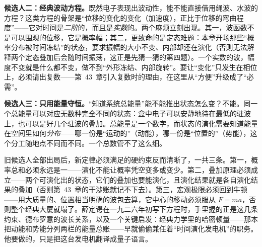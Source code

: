\textbf{候选人二：经典波动方程。}既然电子表现出波动性，能不能直接借用绳波、水波的方程？这类方程的骨架是“位移的变化的变化（加速度），正比于位移的弯曲程度”——它对时间是\emph{二阶}的，而且是\emph{实数}的。两个麻烦立刻出现。其一，波函数不是可以围观的位移，它是概率幅；其二，更致命的是定态难题：本章开场那些“概率分布被时间冻结”的状态，要求振幅的大小不变、内部却还在演化（否则无法解释两个定态叠加后会随时间振荡，这正是先猜一猜的第四题）。一个实数的波，幅度不变就是什么都不变，做不到“外形冻结、内部旋转”。要让“变化”只发生在相位上，必须请出复数——第~43~章引入复数时的理由，在这里从“方便”升级成了“必需”。

\textbf{候选人三：只用能量守恒。}“知道系统总能量”能不能推出状态怎么变？不能。同一个总能量可以对应无数种完全不同的状态：盒中电子可以安静地待在最低的驻波上，也可以是好几个驻波的叠加。总能量是一个数字，而状态的演化需要知道能量在空间里如何\emph{分布}——哪一份是“运动的”（动能），哪一份是“位置的”（势能），这个分工随地点不同而不同。一个总数管不了这么细。

旧候选人全部出局后，新定律必须满足的硬约束反而清晰了，一共三条。第一，概率总和必须永远是一——演化不能让概率凭空变多或变少。第二，叠加原理必须成立——两个可演化出的状态，它们的叠加也要能演化，且演化结果就是各自演化结果的叠加（否则第~43~章的干涉账就记不下去）。第三，宏观极限必须回到牛顿——用大质量的、位置相当明确的波包去算，它中心的移动必须服从 \(F=ma\)，否则整个经典大厦就塌了。薛定谔在一九二六年初写下方程时，手里握的正是这几条约束、德布罗意的波长关系，以及一个关键启发：经典力学里的哈密顿量——那本把动能和势能分列两栏的能量总账——早就偷偷兼任着“时间演化发电机”的职务。他要做的，只是把这台发电机翻译成量子语言。


